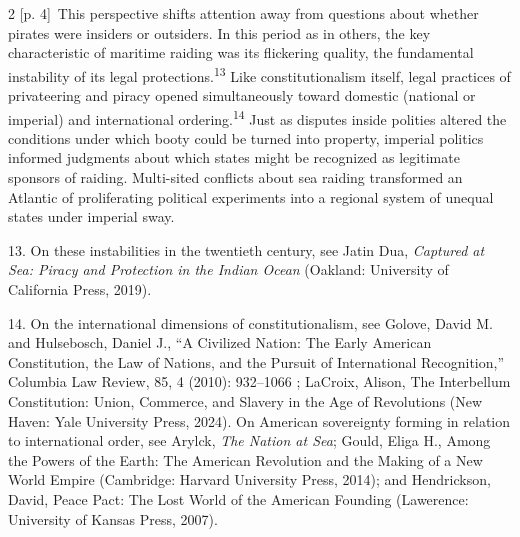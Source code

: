 \documentclass[10pt,a4paper]{article}
\begin{document}
\begin{paracol}{2}
\switchcolumn
{\scriptsize\color{gray} [p. 4]}\ This perspective shifts attention away from questions about whether pirates were insiders or outsiders. In this period as in others, the key characteristic of maritime raiding was its flickering quality, the fundamental instability of its legal protections.\nobreak\textsuperscript{13} Like constitutionalism itself, legal practices of privateering and piracy opened simultaneously toward domestic (national or imperial) and international ordering.\nobreak\textsuperscript{14} Just as disputes inside polities altered the conditions under which booty could be turned into property, imperial politics informed judgments about which states might be recognized as legitimate sponsors of raiding. Multi-sited conflicts about sea raiding transformed an Atlantic of proliferating political experiments into a regional system of unequal states under imperial sway.\par{\small 13. On these instabilities in the twentieth century, see Jatin Dua, \textit{Captured at Sea: Piracy and Protection in the Indian Ocean} (Oakland: University of California Press, 2019).\par}{\small 14. On the international dimensions of constitutionalism, see Golove, David M. and Hulsebosch, Daniel J., “A Civilized Nation: The Early American Constitution, the Law of Nations, and the Pursuit of International Recognition,” Columbia Law Review, 85, 4 (2010): 932–1066 ; LaCroix, Alison, The Interbellum Constitution: Union, Commerce, and Slavery in the Age of Revolutions (New Haven: Yale University Press, 2024). On American sovereignty forming in relation to international order, see Arylck, \textit{The Nation at Sea}; Gould, Eliga H., Among the Powers of the Earth: The American Revolution and the Making of a New World Empire (Cambridge: Harvard University Press, 2014); and Hendrickson, David, Peace Pact: The Lost World of the American Founding (Lawerence: University of Kansas Press, 2007).\par}
\switchcolumn*

\end{paracol}
\end{document}
